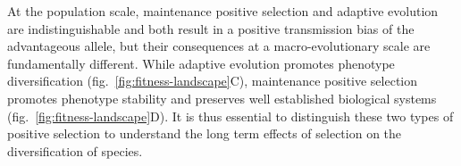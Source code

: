 \documentclass{article}
\begin{document}
    At the population scale, maintenance positive selection and adaptive evolution are indistinguishable and both result in a positive transmission bias of the advantageous allele, but their consequences at a macro-evolutionary scale are fundamentally different.
    While adaptive evolution promotes phenotype diversification (fig.~\ref{fig:fitness-landscape}C), maintenance positive selection promotes phenotype stability and preserves well established biological systems (fig.~\ref{fig:fitness-landscape}D).
    It is thus essential to distinguish these two types of positive selection to understand the long term effects of selection on the diversification of species.
\end{document}
